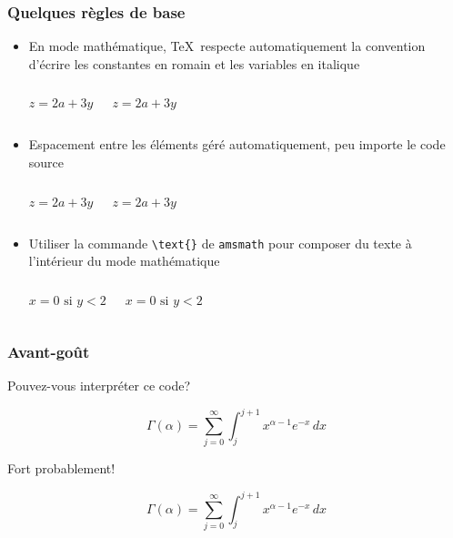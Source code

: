 \begin{frame}[c,fragile]

	\frametitle{Quelques règles de base}
	
	\begin{itemize}
		\item En mode mathématique, \TeX\ respecte automatiquement la convention d’écrire les constantes en romain et les variables en italique
		\begin{columns}
			\vspace{-1.4em}
			\begin{codesource}
	$z = 2a + 3y$	
			\end{codesource}
				$z = 2a + 3y$
		\end{columns}
	
		\item Espacement entre les éléments géré automatiquement, peu importe le code source
		\begin{columns}
			\column{.4\textwidth}
			\vspace{-1.4em}
				\begin{codesource}
	$z=2 a+3 y$
				\end{codesource}
			\column{.4\textwidth}
				$z=2 a+3 y$
		\end{columns}
	
		\item Utiliser la commande \lstinline|\text{}| de \texttt{amsmath} pour composer du
			texte à l’intérieur du mode mathématique
		\begin{columns}
			\vspace{-1.4em}
				\begin{codesource}
	$x = 0 \text{ si } y < 2$
				\end{codesource}
				$x = 0 \text{ si } y < 2$
		\end{columns}
	\end{itemize}
\end{frame}


\begin{frame}[fragile]

	\frametitle{Avant-goût}
	
	Pouvez-vous interpréter ce code?
	
	\begin{codesource}
	\begin{equation*}
		\Gamma(\alpha) =
		\sum_{j = 0}^\infty \int_j^{j + 1}
		x^{\alpha - 1} e^{-x}\, dx
	\end{equation*}
	\end{codesource}

	Fort probablement!
	
	\begin{equation*}
		\Gamma(\alpha) =
		\sum_{j = 0}^\infty \int_j^{j + 1}
		x^{\alpha - 1} e^{-x}\, dx
	\end{equation*}
\end{frame}
